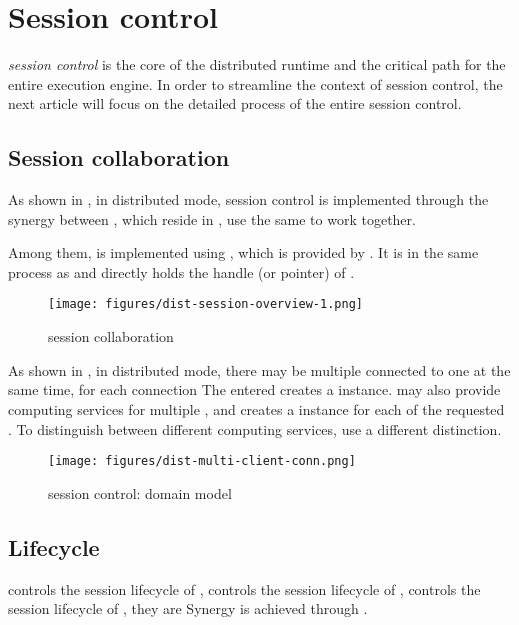 \section{Session control}
\begin{content}
\emph{session control} is the core of the \tf{} distributed runtime and the critical path for the entire \tf{} execution engine. In order to streamline the context of session control, the next article will focus on the detailed process of the entire session control.


\subsection{Session collaboration}
As shown in , in distributed mode, session control is implemented through the synergy between , which reside in , use the same  to work together.

Among them,  is implemented using , which is  provided by \tf{}. It is in the same process as  and directly holds the handle (or pointer) of .

\begin{figure}[H]
  \centering
  \texttt{[image: figures/dist-session-overview-1.png]}
  \caption{session collaboration}
  \label{fig:dist-session-overview}
\end{figure}

As shown in , in distributed mode, there may be multiple  connected to one  at the same time,  for each connection The  entered creates a  instance.  may also provide computing services for multiple , and  creates a  instance for each of the requested . To distinguish between different  computing services, use a different  distinction.

\begin{figure}[H]
  \centering
  \texttt{[image: figures/dist-multi-client-conn.png]}
  \caption{session control: domain model}
  \label{fig:dist-multi-client-conn}
\end{figure}


\subsection{Lifecycle}
 controls the session lifecycle of ,  controls the session lifecycle of ,  controls the session lifecycle of , they are Synergy is achieved through .



\end{content}
